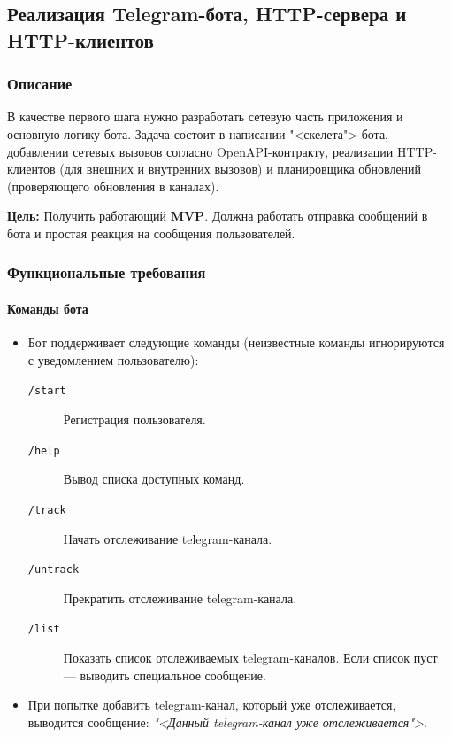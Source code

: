 \subsection{Реализация Telegram-бота, HTTP-сервера и HTTP-клиентов}

\subsubsection{Описание}

В качестве первого шага нужно разработать сетевую часть приложения и основную логику бота. 
Задача состоит в написании "<скелета"> бота, добавлении сетевых вызовов согласно OpenAPI-контракту, реализации HTTP-клиентов (для внешних и внутренних вызовов) и планировщика обновлений (проверяющего обновления в каналах).

\textbf{Цель:} Получить работающий \textbf{MVP}. Должна работать отправка сообщений в бота и простая реакция на сообщения пользователей.

\subsubsection{Функциональные требования}

\paragraph{Команды бота}
\begin{itemize}
    \item Бот поддерживает следующие команды (неизвестные команды игнорируются с уведомлением пользователю):

    \begin{description}
        \item[\texttt{/start}] Регистрация пользователя.
        \item[\texttt{/help}] Вывод списка доступных команд.
        \item[\texttt{/track}] Начать отслеживание telegram-канала.
        \item[\texttt{/untrack}] Прекратить отслеживание telegram-канала.
        \item[\texttt{/list}] Показать список отслеживаемых telegram-каналов. Если список пуст — выводить специальное сообщение.
    \end{description}

    \item При попытке добавить telegram-канал, который уже отслеживается, выводится сообщение: \textit{"<Данный telegram-канал уже отслеживается">}.
\end{itemize}

